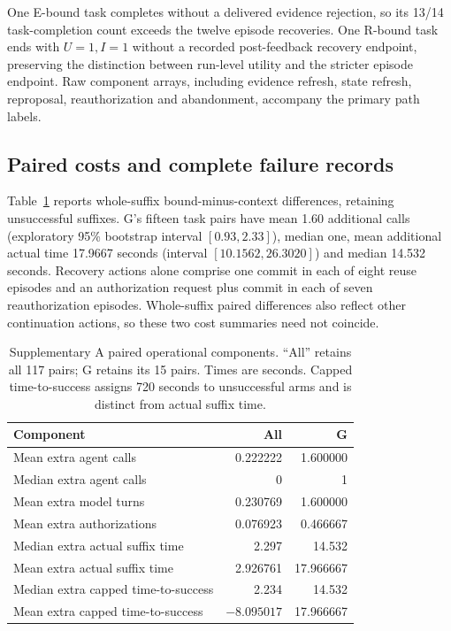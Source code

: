 \documentclass[11pt,a4paper]{article}
\begin{document}
One E-bound task completes without a delivered evidence rejection, so its 13/14 task-completion count exceeds the twelve episode recoveries. One R-bound task ends with $U=1,I=1$ without a recorded post-feedback recovery endpoint, preserving the distinction between run-level utility and the stricter episode endpoint. Raw component arrays, including evidence refresh, state refresh, reproposal, reauthorization and abandonment, accompany the primary path labels.

\subsection{Paired costs and complete failure records}
Table~\ref{tab:supplementary-friction} reports whole-suffix bound-minus-context differences, retaining unsuccessful suffixes. G's fifteen task pairs have mean 1.60 additional calls (exploratory 95\% bootstrap interval $[0.93,2.33]$), median one, mean additional actual time 17.9667 seconds (interval $[10.1562,26.3020]$) and median 14.532 seconds. Recovery actions alone comprise one commit in each of eight reuse episodes and an authorization request plus commit in each of seven reauthorization episodes. Whole-suffix paired differences also reflect other continuation actions, so these two cost summaries need not coincide.

\begin{table}[htbp]
\centering\small
\caption{Supplementary A paired operational components. ``All'' retains all 117 pairs; G retains its 15 pairs. Times are seconds. Capped time-to-success assigns 720 seconds to unsuccessful arms and is distinct from actual suffix time.}\label{tab:supplementary-friction}
\begin{tabular}{@{}lrr@{}}
\toprule
Component & All & G \\
\midrule
Mean extra agent calls & 0.222222 & 1.600000 \\
Median extra agent calls & 0 & 1 \\
Mean extra model turns & 0.230769 & 1.600000 \\
Mean extra authorizations & 0.076923 & 0.466667 \\
Median extra actual suffix time & 2.297 & 14.532 \\
Mean extra actual suffix time & 2.926761 & 17.966667 \\
Median extra capped time-to-success & 2.234 & 14.532 \\
Mean extra capped time-to-success & $-8.095017$ & 17.966667 \\
\bottomrule
\end{tabular}
\end{table}
\end{document}
